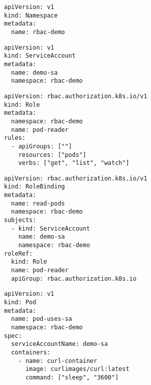 \begin{verbatim}
apiVersion: v1
kind: Namespace
metadata:
  name: rbac-demo
\end{verbatim}
\begin{verbatim}
apiVersion: v1
kind: ServiceAccount
metadata:
  name: demo-sa
  namespace: rbac-demo
\end{verbatim}
\begin{verbatim}
apiVersion: rbac.authorization.k8s.io/v1
kind: Role
metadata:
  namespace: rbac-demo
  name: pod-reader
rules:
  - apiGroups: [""]
    resources: ["pods"]
    verbs: ["get", "list", "watch"]
\end{verbatim}
\begin{verbatim}
apiVersion: rbac.authorization.k8s.io/v1
kind: RoleBinding
metadata:
  name: read-pods
  namespace: rbac-demo
subjects:
  - kind: ServiceAccount
    name: demo-sa
    namespace: rbac-demo
roleRef:
  kind: Role
  name: pod-reader
  apiGroup: rbac.authorization.k8s.io
\end{verbatim}
\begin{verbatim}
apiVersion: v1
kind: Pod
metadata:
  name: pod-uses-sa
  namespace: rbac-demo
spec:
  serviceAccountName: demo-sa
  containers:
    - name: curl-container
      image: curlimages/curl:latest
      command: ["sleep", "3600"]
\end{verbatim}